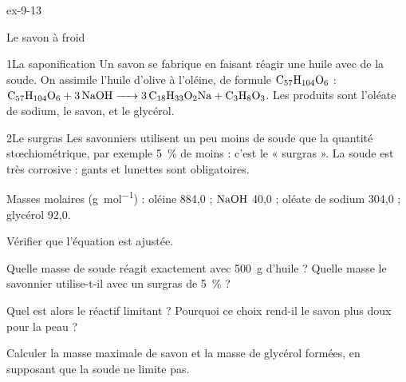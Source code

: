 \begin{blocLivre}{ex-9-13}
\begin{exercice}[3]{Le savon à froid}
\begin{docu}{1}{La saponification}
Un savon se fabrique en faisant réagir une huile avec de la soude. On assimile l'huile d'olive à l'oléine, de formule
$\ce{C57H104O6}$ : $\ce{C57H104O6 + 3NaOH -> 3C18H33O2Na + C3H8O3}$. Les produits sont l'oléate de sodium, le savon, et le glycérol.
\end{docu}
\begin{docu}{2}{Le surgras}
Les savonniers utilisent un peu moins de soude que la quantité stœchiométrique, par exemple \qty{5}{\percent} de moins : c'est le
« surgras ». La soude est très corrosive : gants et lunettes sont obligatoires.
\end{docu}
\begin{donnees}
Masses molaires (\unit{g.mol^{-1}}) : oléine 884,0 ; $\ce{NaOH}$ 40,0 ; oléate de sodium 304,0 ; glycérol 92,0.
\end{donnees}
\begin{questions}
\item Vérifier que l'équation est ajustée.
\item Quelle masse de soude réagit exactement avec \qty{500}{g} d'huile ? Quelle masse le savonnier utilise-t-il avec un surgras de \qty{5}{\percent} ?
\item Quel est alors le réactif limitant ? Pourquoi ce choix rend-il le savon plus doux pour la peau ?
\item \initiative Calculer la masse maximale de savon et la masse de glycérol formées, en supposant que la soude ne limite pas.
\end{questions}
\end{exercice}
\end{blocLivre}

